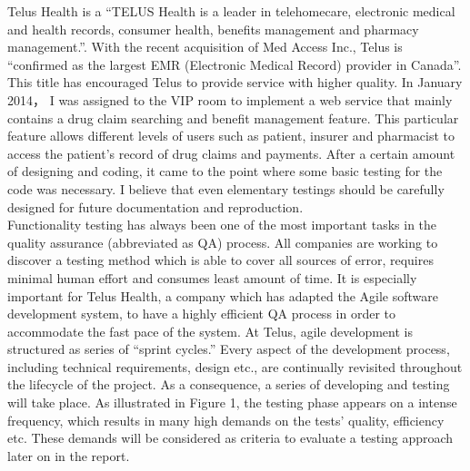 \documentclass[12pt]{article}
\begin{document}
Telus Health is a “TELUS Health is a leader in telehomecare, electronic medical and health records, consumer health, benefits management and pharmacy management.”\cite{telusComp}. With the recent acquisition of Med Access Inc., Telus is “confirmed as the largest EMR (Electronic Medical Record) provider in Canada”\cite{telusComp}. This title has encouraged Telus to provide service with higher quality. In January 2014， I was assigned to the VIP room to implement a web service that mainly contains a drug claim searching and benefit management feature. This particular feature allows different levels of users such as patient, insurer and pharmacist to access the patient's record of drug claims and payments. After a certain amount of designing and coding, it came to the point where some basic testing for the code was necessary. I believe that even elementary testings should be carefully designed for future documentation and reproduction. \\

Functionality testing has always been one of the most important tasks in the quality assurance (abbreviated as QA) process. All companies are working to discover a testing method which is able to cover all sources of error, requires minimal human effort and consumes least amount of time. It is especially important for Telus Health, a company which has adapted the Agile software development system, to have a highly efficient QA process in order to accommodate the fast pace of the system. At Telus, agile development is structured as series of “sprint cycles.” Every aspect of the development process, including technical requirements, design etc., are continually revisited throughout the lifecycle of the project. As a consequence, a series of developing and testing will take place. As illustrated in Figure 1, the testing phase appears on a intense frequency, which results in many high demands on the tests' quality, efficiency etc. These demands will be considered as criteria to evaluate a testing approach later on in the report.\\
\end{document}
